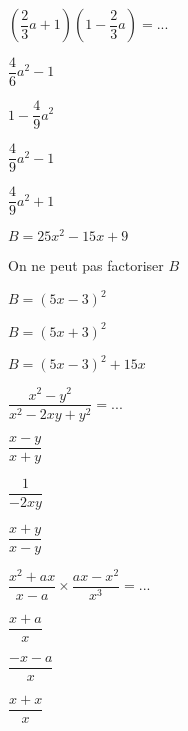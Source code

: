\begin{QCM}
\begin{GroupeQCM}
     \begin{exercice}
      $\left( \dfrac{2}{3}a+1\right) \left( 1-\dfrac{2}{3}a\right) =...$
      \begin{ChoixQCM}{4}
      \item $\dfrac{4}{6}a^2-1$
      \item $1-\dfrac{4}{9}a^2$
      \item $\dfrac{4}{9}a^2-1$
      \item $\dfrac{4}{9}a^2+1$
      \end{ChoixQCM}
      \begin{corrige}
   \end{corrige}
    \end{exercice}
    
    
     \begin{exercice}
      $B=25x^2-15x+9$
      \begin{ChoixQCM}{4}
      \item On ne peut pas factoriser $B$
      \item $B=(5x-3)^2$
      \item $B=(5x+3)^2$
      \item $B=(5x-3)^2+15x$
      \end{ChoixQCM}
      \begin{corrige}
   \end{corrige}
    \end{exercice}
    
      \begin{exercice}
      $\dfrac{x^2-y^2}{x^2-2xy+y^2}=...$
      \begin{ChoixQCM}{3}
      \item $\dfrac{x-y}{x+y}$
      \item $\dfrac{1}{-2xy}$
      \item $\dfrac{x+y}{x-y}$
      \end{ChoixQCM}
      \begin{corrige}
   \end{corrige}
    \end{exercice}
    
      \begin{exercice}
      $\dfrac{x^2+ax}{x-a}\times \dfrac{ax-x^2}{x^3}=...$
      \begin{ChoixQCM}{3}
      \item $\dfrac{x+a}{x}$
      \item $\dfrac{-x-a}{x}$
      \item $\dfrac{x+x}{x}$
      \end{ChoixQCM}
      \begin{corrige}
   \end{corrige}
    \end{exercice}
    

\end{GroupeQCM}
\end{QCM}
